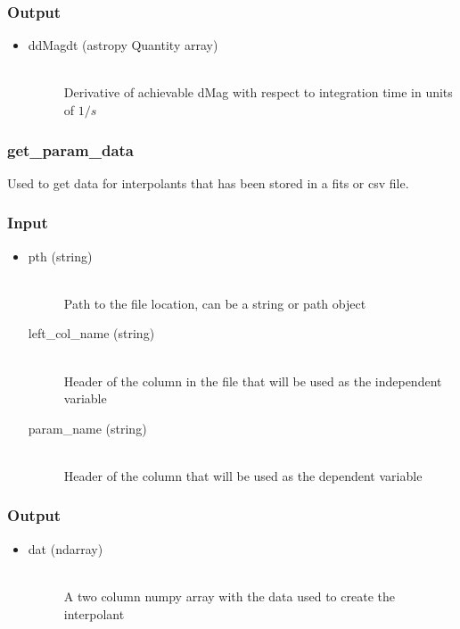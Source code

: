 \documentclass[cleanfoot]{asme2ej}
\begin{document}
\subsubsection*{Output}
\begin{itemize}
\item 
\begin{description}
    \item[ddMagdt (astropy Quantity array)] \hfill \\ Derivative of achievable dMag with respect to integration time in units of $ 1/s $
\end{description}
\end{itemize}


\subsubsection{get\_param\_data} \label{sec:getparamdata}
Used to get data for interpolants that has been stored in a fits or csv file.
\subsubsection*{Input}
\begin{itemize}
\item 
\begin{description}
    \item[pth (string)] \hfill \\ Path to the file location, can be a string or path object
    \item[left\_col\_name (string)] \hfill \\ Header of the column in the file that will be used as the independent variable
    \item[param\_name (string)] \hfill \\ Header of the column that will be used as the dependent variable
\end{description}
\end{itemize}
\subsubsection*{Output}
\begin{itemize}
\item 
\begin{description}
    \item[dat (ndarray)] \hfill \\ A two column numpy array with the data used to create the interpolant
\end{description}
\end{itemize}
\end{document}
